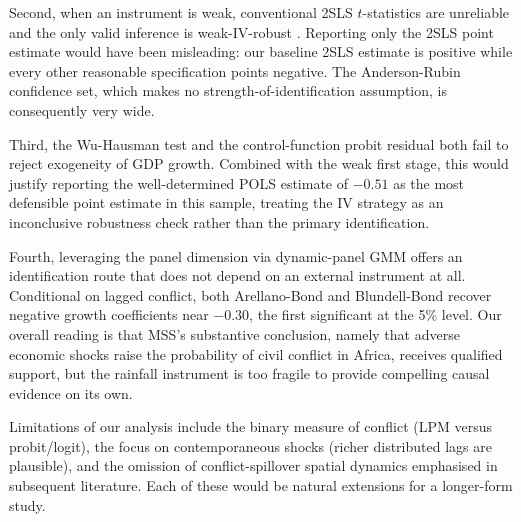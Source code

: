\documentclass[11pt,a4paper]{article}
\begin{document}
Second, when an instrument is weak, conventional 2SLS $t$-statistics
are unreliable and the only valid inference is weak-IV-robust
\citep{AndersonRubin1949,StaigerStock1997}. Reporting only the
2SLS point estimate would have been misleading: our baseline 2SLS
estimate is positive while every other reasonable specification
points negative. The Anderson-Rubin confidence set, which makes no
strength-of-identification assumption, is consequently very wide.

Third, the Wu-Hausman test and the control-function probit residual
both fail to reject exogeneity of GDP growth. Combined with the
weak first stage, this would justify reporting the well-determined
POLS estimate of $-0.51$ as the most defensible point estimate in
this sample, treating the IV strategy as an inconclusive robustness
check rather than the primary identification.

Fourth, leveraging the panel dimension via dynamic-panel GMM offers
an identification route that does not depend on an external
instrument at all. Conditional on lagged conflict, both
Arellano-Bond and Blundell-Bond recover negative growth
coefficients near $-0.30$, the first significant at the 5\% level.
Our overall reading is that MSS's substantive conclusion, namely that adverse
economic shocks raise the probability of civil conflict in
Africa, receives qualified support, but the rainfall instrument is
too fragile to provide compelling causal evidence on its own.

Limitations of our analysis include the binary measure of conflict
(LPM versus probit/logit), the focus on contemporaneous shocks
(richer distributed lags are plausible), and the omission of
conflict-spillover spatial dynamics emphasised in subsequent
literature. Each of these would be natural extensions for a
longer-form study.
\end{document}
